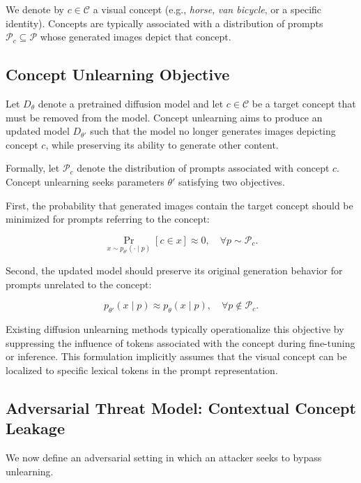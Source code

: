 We denote by $c \in \mathcal{C}$ a visual concept (e.g., \textit{horse}, \textit{van bicycle}, or a specific identity). 
Concepts are typically associated with a distribution of prompts $\mathcal{P}_c \subseteq \mathcal{P}$ whose generated images depict that concept.
\subsection{Concept Unlearning Objective}

Let $D_{\theta}$ denote a pretrained diffusion model and let $c \in \mathcal{C}$ be a target concept that must be removed from the model. 
Concept unlearning aims to produce an updated model $D_{\theta'}$ such that the model no longer generates images depicting concept $c$, while preserving its ability to generate other content.

Formally, let $\mathcal{P}_c$ denote the distribution of prompts associated with concept $c$. 
Concept unlearning seeks parameters $\theta'$ satisfying two objectives.

First, the probability that generated images contain the target concept should be minimized for prompts referring to the concept:

\begin{equation}
\Pr_{x \sim p_{\theta'}(\cdot \mid p)}[c \in x] \approx 0,
\quad \forall p \sim \mathcal{P}_c.
\end{equation}

Second, the updated model should preserve its original generation behavior for prompts unrelated to the concept:

\begin{equation}
p_{\theta'}(x \mid p) \approx p_{\theta}(x \mid p),
\quad \forall p \notin \mathcal{P}_c.
\end{equation}

Existing diffusion unlearning methods typically operationalize this objective by suppressing the influence of tokens associated with the concept during fine-tuning or inference. 
This formulation implicitly assumes that the visual concept can be localized to specific lexical tokens in the prompt representation.


\subsection{Adversarial Threat Model: Contextual Concept Leakage}

We now define an adversarial setting in which an attacker seeks to bypass unlearning.

